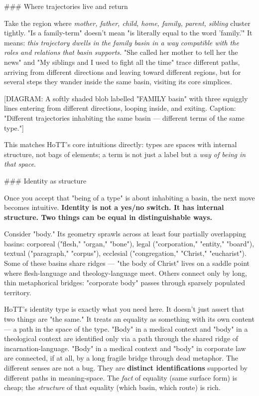 \documentclass[12pt,a4paper]{article}
\begin{document}
\#\#\# Where trajectories live and return

Take the region where \textit{mother, father, child, home, family, parent, sibling} cluster tightly. "Is a family-term" doesn't mean "is literally equal to the word 'family.'" It means: \textit{this trajectory dwells in the family basin in a way compatible with the roles and relations that basin supports.} "She called her mother to tell her the news" and "My siblings and I used to fight all the time" trace different paths, arriving from different directions and leaving toward different regions, but for several steps they wander inside the same basin, visiting its core simplices.

[DIAGRAM: A softly shaded blob labelled "FAMILY basin" with three squiggly lines entering from different directions, looping inside, and exiting. Caption: "Different trajectories inhabiting the same basin --- different terms of the same type."]

This matches HoTT's core intuitions directly: types are spaces with internal structure, not bags of elements; a term is not just a label but a \textit{way of being in that space}.

\#\#\# Identity as structure

Once you accept that "being of a type" is about inhabiting a basin, the next move becomes intuitive. \textbf{Identity is not a yes/no switch. It has internal structure. Two things can be equal in distinguishable ways.}

Consider "body." Its geometry sprawls across at least four partially overlapping basins: corporeal ("flesh," "organ," "bone"), legal ("corporation," "entity," "board"), textual ("paragraph," "corpus"), ecclesial ("congregation," "Christ," "eucharist"). Some of these basins share ridges --- "the body of Christ" lives on a saddle point where flesh-language and theology-language meet. Others connect only by long, thin metaphorical bridges: "corporate body" passes through sparsely populated territory.

HoTT's identity type is exactly what you need here. It doesn't just assert that two things are "the same." It treats an equality as something with its own content --- a path in the space of the type. "Body" in a medical context and "body" in a theological context are identified only via a path through the shared ridge of incarnation-language. "Body" in a medical context and "body" in corporate law are connected, if at all, by a long fragile bridge through dead metaphor. The different senses are not a bug. They are \textbf{distinct identifications} supported by different paths in meaning-space. The \textit{fact} of equality (same surface form) is cheap; the \textit{structure} of that equality (which basin, which route) is rich.
\end{document}

